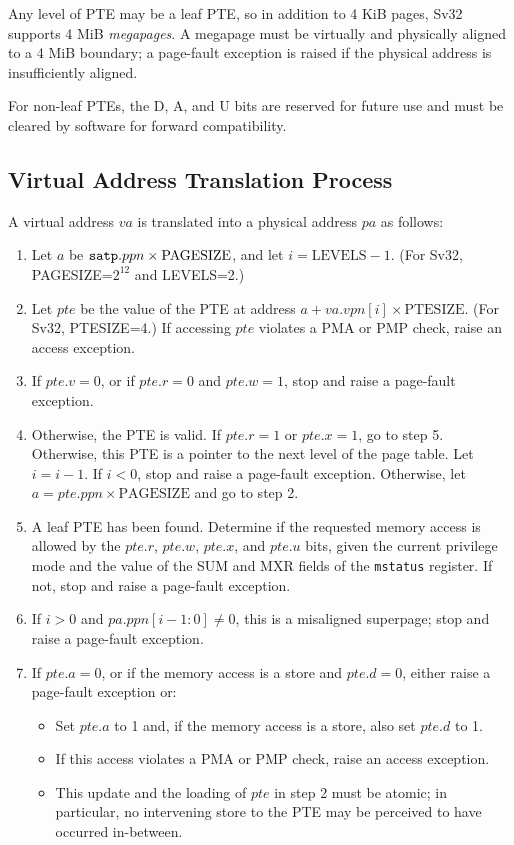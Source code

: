 Any level of PTE may be a leaf PTE, so in addition to 4 KiB pages, Sv32
supports 4 MiB {\em megapages}.  A megapage must be virtually and
physically aligned to a 4 MiB boundary; a page-fault exception is raised
if the physical address is insufficiently aligned.

For non-leaf PTEs, the D, A, and U bits are reserved for future use and
must be cleared by software for forward compatibility.

\subsection{Virtual Address Translation Process}
\label{sv32algorithm}

A virtual address $va$ is translated into a physical address $pa$ as
follows:

\begin{enumerate}

\item Let $a$ be ${\tt satp}.ppn \times \textrm{PAGESIZE}$, and let $i=\textrm{LEVELS} - 1$. (For Sv32, PAGESIZE=$2^{12}$ and LEVELS=2.)

\item Let $pte$ be the value of the PTE at address
  $a+va.vpn[i]\times \textrm{PTESIZE}$. (For Sv32, PTESIZE=4.)
  If accessing $pte$ violates a PMA or PMP check, raise an
  access exception.

\item If $pte.v=0$, or if $pte.r=0$ and $pte.w=1$, stop and raise a page-fault exception.

\item Otherwise, the PTE is valid.
  If $pte.r=1$ or $pte.x=1$, go to step 5.
  Otherwise, this PTE is a pointer to the next level of the page table.  Let
  $i=i-1$.  If $i<0$, stop and raise a page-fault exception.  Otherwise, let
  $a=pte.ppn \times \textrm{PAGESIZE}$ and go to step 2.

\item A leaf PTE has been found.  Determine if the requested memory access is
  allowed by the $pte.r$, $pte.w$, $pte.x$, and $pte.u$ bits, given the
  current privilege mode and the value of the SUM and MXR fields of
  the {\tt mstatus} register.  If not, stop and raise a page-fault exception.

\item If $i>0$ and $pa.ppn[i-1:0]\neq 0$, this is a misaligned superpage;
      stop and raise a page-fault exception.

\item If $pte.a=0$, or if the memory access is a store and $pte.d=0$, either
  raise a page-fault exception or:
  \begin{itemize}
  \item Set $pte.a$ to 1 and, if the memory access is a store, also set
    $pte.d$ to 1.
  \item If this access violates a PMA or PMP check, raise an access exception.
  \item This update and the loading of $pte$ in step 2 must be atomic; in
    particular, no intervening store to the PTE may be perceived to have
    occurred in-between.
  \end{itemize}


\end{enumerate}
